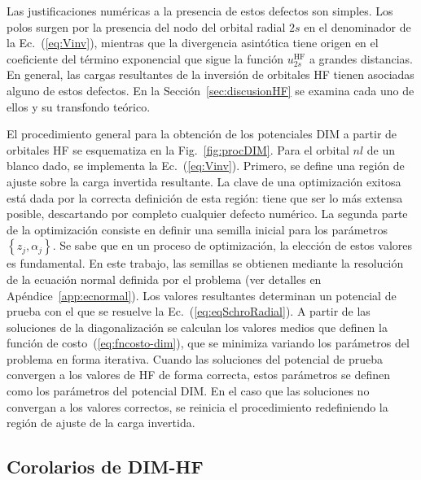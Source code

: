 Las justificaciones numéricas a la presencia de estos defectos son 
simples. Los polos surgen por la presencia del nodo del orbital radial 
$2s$ en el denominador de la Ec.~(\ref{eq:Vinv}), mientras que la 
divergencia asintótica tiene origen en el coeficiente del término 
exponencial que sigue la función $u_{2s}^{\mathrm{HF}}$ a grandes 
distancias. En general, las cargas resultantes de la inversión de 
orbitales HF tienen asociadas alguno de estos defectos. En la 
Sección~\ref{sec:discusionHF} se examina cada uno de ellos y su 
transfondo teórico.

El procedimiento general para la obtención de los potenciales DIM a 
partir de orbitales HF se esquematiza en la Fig.~\ref{fig:procDIM}. Para 
el orbital $nl$ de un blanco dado, se implementa la Ec.~(\ref{eq:Vinv}). 
Primero, se define una región de ajuste sobre la carga invertida 
resultante. La clave de una optimización exitosa está dada por la 
correcta definición de esta región: tiene que ser lo más extensa 
posible, descartando por completo cualquier defecto numérico. La segunda 
parte de la optimización consiste en definir una semilla inicial para 
los parámetros $\left\{z_j,\alpha_j\right\}$. Se sabe que en un proceso 
de optimización, la elección de estos valores es fundamental. En este 
trabajo, las semillas se obtienen mediante la resolución de la ecuación 
normal definida por el problema (ver detalles en 
Apéndice~\ref{app:ecnormal}). Los valores resultantes determinan un 
potencial de prueba con el que se resuelve la 
Ec.~(\ref{eq:eqSchroRadial}). A partir de las soluciones de la 
diagonalización se calculan los valores medios que definen la función de 
costo~(\ref{eq:fncosto-dim}), que se minimiza variando los parámetros 
del problema en forma iterativa. Cuando las soluciones del potencial de 
prueba convergen a los valores de HF de forma correcta, estos parámetros 
se definen como los parámetros del potencial DIM. En el caso que las 
soluciones no convergan a los valores correctos, se reinicia el 
procedimiento redefiniendo la región de ajuste de la carga invertida.

\subsection{Corolarios de DIM-HF}
\label{sec:corolarios}

